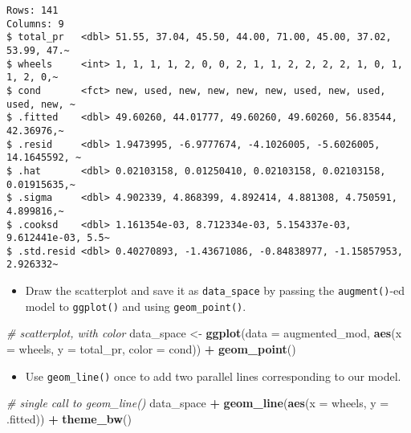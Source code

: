 \documentclass[
]{book}
\newenvironment{Shaded}{\begin{snugshade}}{\end{snugshade}}
\newcommand{\CommentTok}[1]{\textcolor[rgb]{0.56,0.35,0.01}{\textit{#1}}}
\newcommand{\DataTypeTok}[1]{\textcolor[rgb]{0.13,0.29,0.53}{#1}}
\newcommand{\KeywordTok}[1]{\textcolor[rgb]{0.13,0.29,0.53}{\textbf{#1}}}
\newcommand{\NormalTok}[1]{#1}
\newcommand{\OperatorTok}[1]{\textcolor[rgb]{0.81,0.36,0.00}{\textbf{#1}}}
\newcommand{\StringTok}[1]{\textcolor[rgb]{0.31,0.60,0.02}{#1}}
\providecommand{\tightlist}{%
  \setlength{\itemsep}{0pt}\setlength{\parskip}{0pt}}
\begin{document}
\begin{verbatim}
Rows: 141
Columns: 9
$ total_pr   <dbl> 51.55, 37.04, 45.50, 44.00, 71.00, 45.00, 37.02, 53.99, 47.~
$ wheels     <int> 1, 1, 1, 1, 2, 0, 0, 2, 1, 1, 2, 2, 2, 2, 1, 0, 1, 1, 2, 0,~
$ cond       <fct> new, used, new, new, new, new, used, new, used, used, new, ~
$ .fitted    <dbl> 49.60260, 44.01777, 49.60260, 49.60260, 56.83544, 42.36976,~
$ .resid     <dbl> 1.9473995, -6.9777674, -4.1026005, -5.6026005, 14.1645592, ~
$ .hat       <dbl> 0.02103158, 0.01250410, 0.02103158, 0.02103158, 0.01915635,~
$ .sigma     <dbl> 4.902339, 4.868399, 4.892414, 4.881308, 4.750591, 4.899816,~
$ .cooksd    <dbl> 1.161354e-03, 8.712334e-03, 5.154337e-03, 9.612441e-03, 5.5~
$ .std.resid <dbl> 0.40270893, -1.43671086, -0.84838977, -1.15857953, 2.926332~
\end{verbatim}

\begin{itemize}
\tightlist
\item
  Draw the scatterplot and save it as \texttt{data\_space} by passing the \texttt{augment()}-ed model to \texttt{ggplot()} and using \texttt{geom\_point()}.
\end{itemize}

\begin{Shaded}
\begin{Highlighting}[]
\CommentTok{# scatterplot, with color}
\NormalTok{data_space <-}\StringTok{ }\KeywordTok{ggplot}\NormalTok{(}\DataTypeTok{data =}\NormalTok{ augmented_mod, }
                     \KeywordTok{aes}\NormalTok{(}\DataTypeTok{x =}\NormalTok{ wheels, }\DataTypeTok{y =}\NormalTok{ total_pr, }
                         \DataTypeTok{color =}\NormalTok{ cond)) }\OperatorTok{+}\StringTok{ }
\StringTok{  }\KeywordTok{geom_point}\NormalTok{()}
\end{Highlighting}
\end{Shaded}

\begin{itemize}
\tightlist
\item
  Use \texttt{geom\_line()} once to add two parallel lines corresponding to our model.
\end{itemize}

\begin{Shaded}
\begin{Highlighting}[]
\CommentTok{# single call to geom_line()}
\NormalTok{data_space }\OperatorTok{+}\StringTok{ }
\StringTok{  }\KeywordTok{geom_line}\NormalTok{(}\KeywordTok{aes}\NormalTok{(}\DataTypeTok{x =}\NormalTok{ wheels, }\DataTypeTok{y =}\NormalTok{ .fitted)) }\OperatorTok{+}\StringTok{ }
\StringTok{  }\KeywordTok{theme_bw}\NormalTok{()}
\end{Highlighting}
\end{Shaded}
\end{document}
